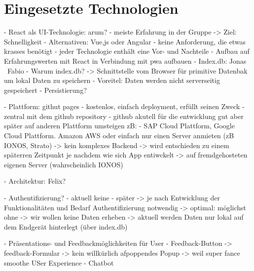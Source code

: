 \section{Eingesetzte Technologien}
- React als UI-Technologie: arum?
	- meiste Erfahrung in der Gruppe -> Ziel: Schnelligkeit
	- Alternativen: Vue,js oder Angular
	- keine Anforderung, die etwas krasses benötigt
	- jeder Technologie enthält eine Vor- und Nachteile
	- Aufbau auf Erfahrungswerten mit React in Verbindung mit pwa aufbauen
- Index.db: Jonas \ Fabio
	- Warum index.db? -> Schnittstelle vom Browser für primitive Datenbak um lokal Daten zu speichern
	- Voreitel: Daten werden nicht serverseitig gespeichert
	- Persistierung?
	
- Plattform: githut pages
	- kostenlos, einfach deployment, erfüllt seinen Zweck
	- zentral mit dem github repository
	- github akutell für die entwicklung gut aber später auf anderen Plattform umsteigen zB:
	- SAP Cloud Plattform, Google Cloud Plattform. Amazon AWS oder einfach nur einen Server anmieten (zB IONOS, Strato) -> kein komplexes Backend -> wird entschieden zu einem späterren Zeitpunkt je nachdem wie sich App entiwckelt -> auf fremdgehosteten eigenen Server (wahrscheinlich IONOS) 

- Architektur: Felix?

- Authentifizierung? 
	- aktuell keine
	- später -> je nach Entwicklung der Funktionalitäten und Bedarf Authentifizierung notwendig -> optimal: möglichst ohne -> wir wollen keine Daten erheben -> aktuell werden Daten nur lokal auf dem Endgerät hinterlegt (über index.db)

- Präsentations- und Feedbackmöglichkeiten für User
	- Feedback-Button -> feedback-Formular -> kein willkürlich afpoppendes Popup -> weil super fance smoothe USer Experience
	- Chatbot
	


